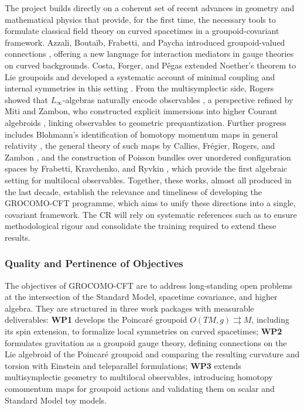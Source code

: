 \documentclass[11pt]{msca-pf}
\begin{document}
The project builds directly on a coherent set of recent advances in geometry and mathematical physics that provide, for the first time, the necessary tools to formulate classical field theory on curved spacetimes in a groupoid-covariant framework.  
Azzali, Boutaïb, Frabetti, and Paycha introduced groupoid-valued connections \cite{Azzali2022}, offering a new language for interaction mediators in gauge theories on curved backgrounds. Costa, Forger, and Pêgas extended Noether’s theorem to Lie groupoids and developed a systematic account of minimal coupling and internal symmetries in this setting \cite{Costa-Forger-Pegas-2018,Costa-Forger-Pegas-2021}.  
From the multisymplectic side, Rogers showed that $L_\infty$-algebras naturally encode observables \cite{Rogers2010}, a perspective refined by Miti and Zambon, who constructed explicit immersions into higher Courant algebroids \cite{Miti2022}, linking observables to geometric prequantization.  
Further progress includes Blohmann’s identification of homotopy momentum maps in general relativity \cite{Blohmann2023}, the general theory of such maps by Callies, Frégier, Rogers, and Zambon \cite{Callies2016}, and the construction of Poisson bundles over unordered configuration spaces by Frabetti, Kravchenko, and Ryvkin \cite{Frabetti2025}, which provide the first algebraic setting for multilocal observables.  
Together, these works, almost all produced in the last decade, establish the relevance and timeliness of developing the GROCOMO-CFT programme, which aims to unify these directions into a single, covariant framework. The CR will rely on systematic references such as \cite{Mackenzie2005,MoerdijkMrcun2003,MeinrenkenNotes,Weinstein1996,OlverSGWQ} to ensure methodological rigour and consolidate the training required to extend these results.


\subsubsection*{Quality and Pertinence of Objectives}

The objectives of GROCOMO-CFT are to address long-standing open problems at the intersection of the Standard Model, spacetime covariance, and higher algebra. They are structured in three work packages with measurable deliverables:  
\textbf{WP1} develops the Poincaré groupoid $O(TM,g)\rightrightarrows M$, including its spin extension, to formalize local symmetries on curved spacetimes;  
\textbf{WP2} formulates gravitation as a groupoid gauge theory, defining connections on the Lie algebroid of the Poincaré groupoid and comparing the resulting curvature and torsion with Einstein and teleparallel formulations;  
\textbf{WP3} extends multisymplectic geometry to multilocal observables, introducing homotopy comomentum maps for groupoid actions and validating them on scalar and Standard Model toy models.  
\end{document}
